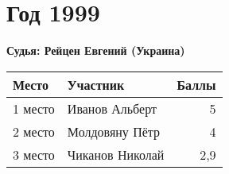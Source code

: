 \chapter{Год 1999}
\textbf{Судья: Рейцен Евгений (Украина)}

\begin{tabularx}{\textwidth}{l l r}
Место & Участник & Баллы \\
\hline
1 место & Иванов Альберт & 5 \\
2 место & Молдовяну Пётр & 4 \\
3 место & Чиканов Николай & 2,9 \\
\end{tabularx}
